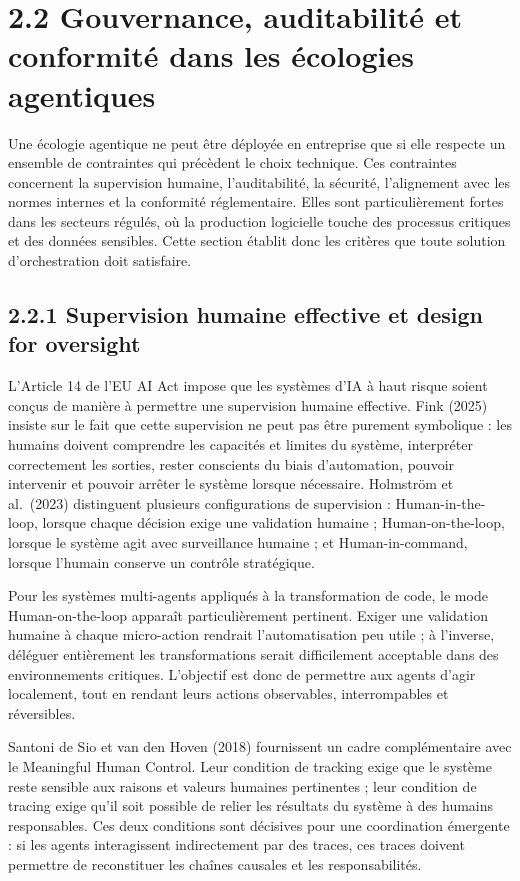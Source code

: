 \section{2.2 Gouvernance, auditabilité et conformité dans les écologies agentiques}\label{gouvernance-auditabilituxe9-et-conformituxe9-dans-les-uxe9cologies-agentiques}

Une écologie agentique ne peut être déployée en entreprise que si elle respecte un ensemble de contraintes qui précèdent le choix technique. Ces contraintes concernent la supervision humaine, l'auditabilité, la sécurité, l'alignement avec les normes internes et la conformité réglementaire. Elles sont particulièrement fortes dans les secteurs régulés, où la production logicielle touche des processus critiques et des données sensibles. Cette section établit donc les critères que toute solution d'orchestration doit satisfaire.

\subsection{2.2.1 Supervision humaine effective et design for oversight}\label{supervision-humaine-effective-et-design-for-oversight}

L'Article 14 de l'EU AI Act impose que les systèmes d'IA à haut risque soient conçus de manière à permettre une supervision humaine effective. Fink (2025) insiste sur le fait que cette supervision ne peut pas être purement symbolique : les humains doivent comprendre les capacités et limites du système, interpréter correctement les sorties, rester conscients du biais d'automation, pouvoir intervenir et pouvoir arrêter le système lorsque nécessaire. Holmström et al.~(2023) distinguent plusieurs configurations de supervision : Human-in-the-loop, lorsque chaque décision exige une validation humaine ; Human-on-the-loop, lorsque le système agit avec surveillance humaine ; et Human-in-command, lorsque l'humain conserve un contrôle stratégique.

Pour les systèmes multi-agents appliqués à la transformation de code, le mode Human-on-the-loop apparaît particulièrement pertinent. Exiger une validation humaine à chaque micro-action rendrait l'automatisation peu utile ; à l'inverse, déléguer entièrement les transformations serait difficilement acceptable dans des environnements critiques. L'objectif est donc de permettre aux agents d'agir localement, tout en rendant leurs actions observables, interrompables et réversibles.

Santoni de Sio et van den Hoven (2018) fournissent un cadre complémentaire avec le Meaningful Human Control. Leur condition de tracking exige que le système reste sensible aux raisons et valeurs humaines pertinentes ; leur condition de tracing exige qu'il soit possible de relier les résultats du système à des humains responsables. Ces deux conditions sont décisives pour une coordination émergente : si les agents interagissent indirectement par des traces, ces traces doivent permettre de reconstituer les chaînes causales et les responsabilités.

